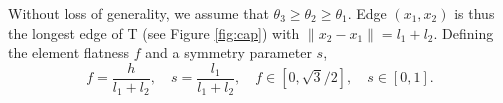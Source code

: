 \documentclass{article}
\theoremstyle{remark}
\begin{document}
Without loss of generality, we  assume  that $\theta_3 \geq \theta_2 \geq \theta_1$. 
Edge $({x}_1, {x}_2)$ is thus the longest edge of T (see
Figure \ref{fig:cap}) with $\|{x}_2 - {x}_1\| = l_1+l_2$. 
Defining the element flatness $f$ and a symmetry parameter $s$, 
\begin{equation}
    f = \frac{h} {l_1+l_2}, \quad s = \frac{l_1}{l_1+l_2}, \quad f \in\left[0,
      {\sqrt{3}/2}\right], \quad s \in [ 0, 1 ].
    \label{eq:f}
\end{equation}
\end{document}
